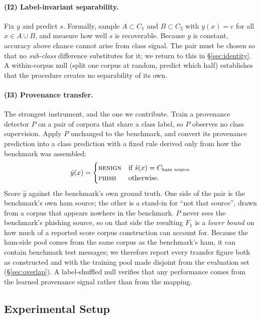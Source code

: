 \documentclass[twoside,11pt]{article}
\begin{document}
\paragraph{(I2) Label-invariant separability.}
Fix $y$ and predict $s$. Formally, sample $A\subset C_1$ and $B\subset C_2$
with $y(x)=c$ for all $x\in A\cup B$, and measure how well $s$ is recoverable.
Because $y$ is constant, accuracy above chance cannot arise from class signal.
The pair must be chosen so that no \emph{sub-class} difference substitutes for
it; we return to this in \S\ref{sec:identity}. A within-corpus null (split one
corpus at random, predict which half) establishes that the procedure creates
no separability of its own.

\paragraph{(I3) Provenance transfer.}
The strongest instrument, and the one we contribute. Train a provenance
detector $P$ on a pair of corpora that share a class label, so $P$ observes no
class supervision. Apply $P$ unchanged to the benchmark, and convert its
provenance prediction into a class prediction with a fixed rule derived only
from how the benchmark was assembled:
\[
\hat{y}(x)=
\begin{cases}
\textsc{benign} & \text{if } \hat{s}(x)=C_{\text{ham source}}\\
\textsc{phish}  & \text{otherwise.}
\end{cases}
\]
Score $\hat{y}$ against the benchmark's own ground truth. One side of the pair
is the benchmark's own ham source; the other is a stand-in for ``not that
source'', drawn from a corpus that appears nowhere in the benchmark. $P$ never
sees the benchmark's phishing source, so on that side the resulting $F_1$ is a
\emph{lower bound} on how much of a reported score corpus construction can
account for. Because the ham-side pool comes from the same corpus as the
benchmark's ham, it can contain benchmark test messages; we therefore report
every transfer figure both as constructed and with the training pool made
disjoint from the evaluation set (\S\ref{sec:overlap}). A label-shuffled null
verifies that any performance comes from the learned provenance signal rather
than from the mapping.

\subsection{Experimental Setup}
\end{document}
